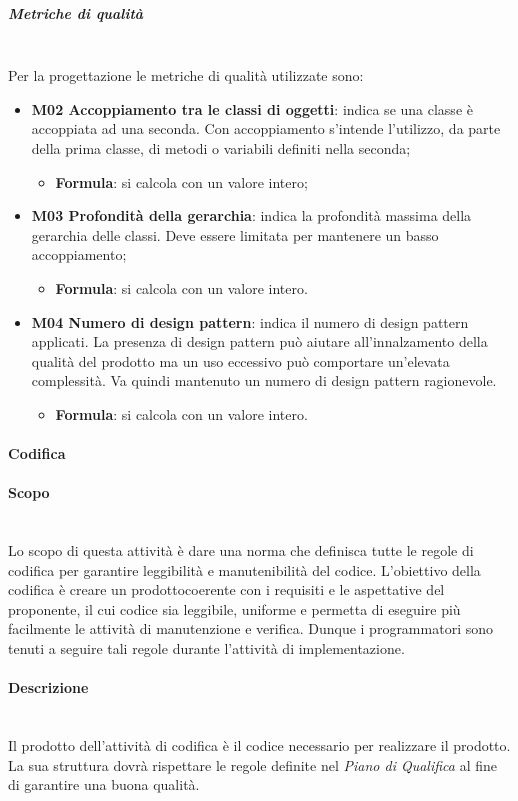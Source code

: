 \subparagraph{Metriche di qualità} \mbox{} \\
Per la progettazione le metriche di qualità utilizzate sono:
\begin{itemize}
	\item \textbf{M02 Accoppiamento tra le classi di oggetti}: indica se una classe è accoppiata ad una seconda. Con accoppiamento s'intende l'utilizzo, da parte della prima classe, di metodi o variabili definiti nella seconda; 
	\begin{itemize}
		\item[] \textbf{Formula}: si calcola con un valore intero;
	\end{itemize}
	\item \textbf{M03 Profondità della gerarchia}: indica la profondità massima della gerarchia delle classi. Deve essere limitata per mantenere un basso accoppiamento;
	\begin{itemize}
		\item[] \textbf{Formula}: si calcola con un valore intero.
	\end{itemize} 	
	\item \textbf{M04 Numero di design pattern}: indica il numero di design pattern applicati. La presenza di design pattern può aiutare all'innalzamento della qualità del prodotto ma un uso eccessivo può comportare un'elevata complessità. Va quindi mantenuto un numero di design pattern ragionevole.
	\begin{itemize}
		\item[] \textbf{Formula}: si calcola con un valore intero.
	\end{itemize} 	
\end{itemize}
		\paragraph{Codifica}
		\paragraph*{Scopo}\mbox{}\\ [1mm]
		Lo scopo di questa attività è dare una norma che definisca tutte le regole di codifica per garantire leggibilità e manutenibilità del codice.
		L'obiettivo della codifica è creare un prodotto\glosp coerente con i requisiti e le aspettative del proponente, il cui codice sia leggibile, uniforme e permetta di eseguire più facilmente le attività di manutenzione e verifica. Dunque i programmatori sono tenuti a seguire tali regole durante l'attività di implementazione.
		\paragraph*{Descrizione}\mbox{}\\ [1mm]
		Il prodotto dell'attività di codifica è il codice necessario per realizzare il prodotto\glo. La sua struttura dovrà rispettare le regole definite nel \textit{Piano di Qualifica} al fine di garantire una buona qualità.
